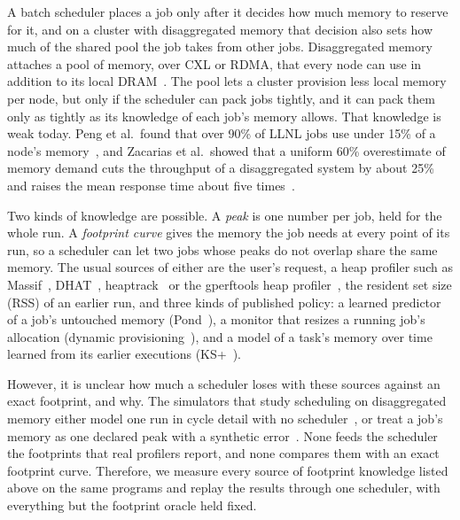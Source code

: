 \documentclass[11pt]{article}
\newcommand{\term}[1]{\emph{#1}}
\begin{document}
A batch scheduler places a job only after it decides how much memory to reserve for it, and on a cluster with
disaggregated memory that decision also sets how much of the shared pool the job takes from other jobs. Disaggregated
memory attaches a pool of memory, over CXL or RDMA, that every node can use in addition to its local
DRAM~\cite{Li2023Pond,Zacarias2021Throughput}. The pool lets a cluster provision less local memory per node, but only if
the scheduler can pack jobs tightly, and it can pack them only as tightly as its knowledge of each job's memory allows.
That knowledge is weak today. Peng et al.\ found that over 90\% of LLNL jobs use under 15\% of a node's
memory~\cite{Peng2020Underutilization}, and Zacarias et al.\ showed that a uniform 60\% overestimate of memory demand cuts
the throughput of a disaggregated system by about 25\% and raises the mean response time about five
times~\cite{Zacarias2021Accurate}.

Two kinds of knowledge are possible. A \term{peak} is one number per job, held for the whole run. A \term{footprint
curve} gives the memory the job needs at every point of its run, so a scheduler can let two jobs whose peaks do not
overlap share the same memory. The usual sources of either are the user's request, a heap profiler such as
Massif~\cite{ValgrindMassif}, DHAT~\cite{ValgrindDHAT}, heaptrack~\cite{heaptrack} or the gperftools heap
profiler~\cite{gperftools}, the resident set size (RSS) of an earlier run, and three kinds of published policy: a
learned predictor of a job's untouched memory (Pond~\cite{Li2023Pond}), a monitor that resizes a running job's allocation
(dynamic provisioning~\cite{Zacarias2023Dynamic}), and a model of a task's memory over time learned from its earlier
executions (KS+~\cite{KSplus2024}).

However, it is unclear how much a scheduler loses with these sources against an exact footprint, and why. The
simulators that study scheduling on disaggregated memory either model one run in cycle detail with no
scheduler~\cite{Puri2024DRackSim,CXLClusterSim,CXLDMSim,Yang2023CXLMemSim}, or treat a job's memory as one declared peak
with a synthetic error~\cite{Zacarias2021Accurate,Zacarias2021Throughput}. None feeds the scheduler the footprints that
real profilers report, and none compares them with an exact footprint curve. Therefore, we measure every source of
footprint knowledge listed above on the same programs and replay the results through one scheduler, with everything but
the footprint oracle held fixed.
\end{document}
